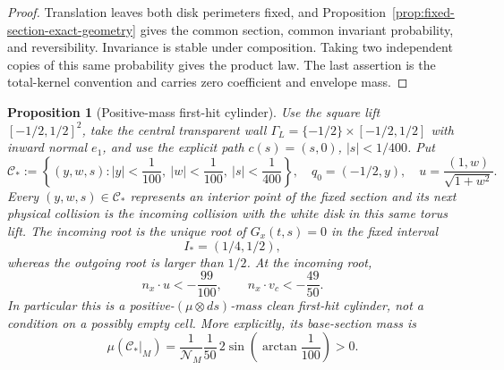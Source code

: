 \documentclass[11pt]{article}
\newtheorem{proposition}[theorem]{Proposition}
\begin{document}
\begin{proof}
Translation leaves both disk perimeters fixed, and
Proposition~\ref{prop:fixed-section-exact-geometry} gives the common section,
common invariant probability, and reversibility.  Invariance is stable under
composition.  Taking two independent copies of this same probability gives
the product law.  The last assertion is the total-kernel convention and
carries zero coefficient and envelope mass.
\end{proof}

\begin{proposition}[Positive-mass first-hit cylinder]
\label{prop:fixed-section-positive-first-hit-cylinder}
Use the square lift $[-1/2,1/2]^2$, take the central transparent wall
$\Gamma_L=\{-1/2\}\times[-1/2,1/2]$ with inward normal $e_1$, and use the
explicit path $c(s)=(s,0)$, $|s|<1/400$.  Put
\begin{equation}
\label{eq:fixed-section-explicit-cylinder}
 \mathcal C_*:=\left\{(y,w,s):
 |y|<\frac1{100},\ |w|<\frac1{100},\ |s|<\frac1{400}\right\},
 \quad
 q_0=(-1/2,y),\quad
 u=\frac{(1,w)}{\sqrt{1+w^2}}.
\end{equation}
Every $(y,w,s)\in\mathcal C_*$ represents an interior point of the fixed
section and its next physical collision is the incoming collision with the
white disk in this same torus lift.  The incoming root is the unique root of
$G_x(t,s)=0$ in the fixed interval
\begin{equation}
 I_*=(1/4,1/2),
\label{eq:fixed-section-first-hit-interval}
\end{equation}
whereas the outgoing root is larger than $1/2$.  At the incoming root,
\begin{equation}
 n_x\cdot u<-\frac{99}{100},
 \qquad
 n_x\cdot v_c<-\frac{49}{50}.
\label{eq:fixed-section-cylinder-transversality}
\end{equation}
In particular this is a positive-$(\mu\otimes ds)$-mass clean first-hit
cylinder, not a condition on a possibly empty cell.  More explicitly, its
base-section mass is
\begin{equation}
 \mu(\mathcal C_*|_M)
 =\frac1{\mathcal N_M}\frac1{50}\,
   2\sin\!\left(\arctan\frac1{100}\right)>0.
\label{eq:fixed-section-cylinder-positive-mass}
\end{equation}
\end{proposition}
\end{document}
